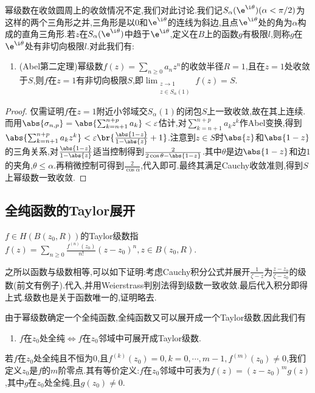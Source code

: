 \documentclass{article}
\begin{document}
幂级数在收敛圆周上的收敛情况不定,我们对此讨论.我们记$S_\alpha(\e^{\i\theta})(\alpha<\pi/2)$为这样的两个三角形之并,三角形是以0和$\e^{\i\theta}$的连线为斜边,且点$\e^{\i\theta}$处的角为$\alpha$构成的直角三角形.若$z$在$S_\alpha(\e^{\i\theta})$中趋于$\e^{\i\theta}$,定义在$B$上的函数$g$有极限$l$,则称$g$在$\e^{\i\theta}$处有非切向极限$l$.对此我们有:

\begin{enumerate}[resume]
    \item (Abel第二定理)幂级数$f(z)=\sum_{n\geq 0}a_nz^n$的收敛半径$R=1$,且在$z=1$处收敛于$S$,则$f$在$z=1$有非切向极限$S$,即$\lim_{\substack{z\to 1\\z\in S_\alpha(1)}}f(z)=S$.
\end{enumerate}
\dayhrule
\begin{proof}
    仅需证明$f$在$z=1$附近小邻域交$S_\alpha(1)$的闭包$S$上一致收敛,故在其上连续.而用$\abs{\sigma_{n,p}}=\abs{\sum_{k=n+1}^{n+p}a_k}<\varepsilon$估计,对$\sum_{k=n+1}^{n+p}a_kz^k$作Abel变换,得到$\abs{\sum_{k=n+1}^{n+p}a_kz^k}<\varepsilon\br{\frac{\abs{1-z}}{1-\abs{z}}+1}$.注意到$z\in S$时$\abs{z}$和$\abs{1-z}$的三角关系,对$\frac{\abs{1-z}}{1-\abs{z}}$适当控制得到$\frac{2}{2\cos\theta-\abs{1-z}}$.其中$\theta$是边$\abs{1-z}$和边$1$的夹角,$\theta\leq\alpha$.再稍微控制可得到$\frac{2}{\cos\alpha}$,代入即可.最终其满足Cauchy收敛准则,得到$S$上幂级数一致收敛.
\end{proof}

\subsection{全纯函数的Taylor展开}
$f\in H(B(z_0,R))$的Taylor级数指$f(z)=\sum_{n\geq 0}\frac{f^{(n)}(z_0)}{n!}(z-z_0)^n, z\in B(z_0,R)$.

之所以函数与级数相等,可以如下证明:考虑Cauchy积分公式并展开$\frac{1}{\zeta-z}$为$\frac{z-z_0}{\zeta-z_0}$的级数(前文有例子).代入,并用Weierstrass判别法得到级数一致收敛.最后代入积分即得上式.级数也是关于函数唯一的,证明略去.

由于幂级数确定一个全纯函数,全纯函数又可以展开成一个Taylor级数,因此我们有
\begin{enumerate}
    \item $f$在$z_0$处全纯$\iff f$在$z_0$邻域中可展开成Taylor级数.
\end{enumerate}

若$f$在$z_0$处全纯且不恒为0,且$f^{(k)}(z_0)=0, k=0,\cdots,m-1, f^{(m)}(z_0)\neq 0$,我们定义$z_0$是$f$的$m$阶零点.其有等价定义:$f$在$z_0$邻域中可表为$f(z)=(z-z_0)^m g(z)$,其中$g$在$z_0$处全纯,且$g(z_0)\neq 0$.
\end{document}
